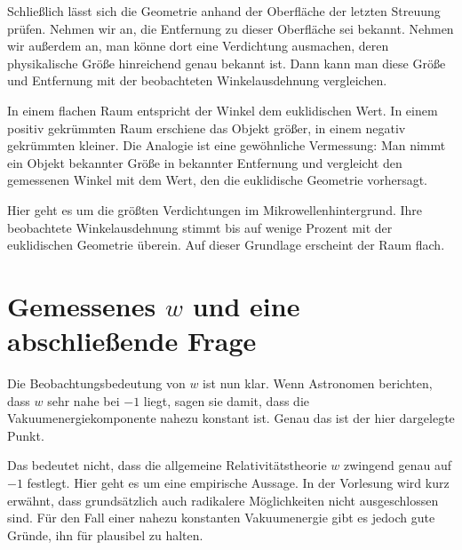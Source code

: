 Schließlich lässt sich die Geometrie anhand der Oberfläche der letzten Streuung prüfen. Nehmen wir an, die Entfernung zu dieser Oberfläche sei bekannt. Nehmen wir außerdem an, man könne dort eine Verdichtung ausmachen, deren physikalische Größe hinreichend genau bekannt ist. Dann kann man diese Größe und Entfernung mit der beobachteten Winkelausdehnung vergleichen.

In einem flachen Raum entspricht der Winkel dem euklidischen Wert. In einem positiv gekrümmten Raum erschiene das Objekt größer, in einem negativ gekrümmten kleiner. Die Analogie ist eine gewöhnliche Vermessung: Man nimmt ein Objekt bekannter Größe in bekannter Entfernung und vergleicht den gemessenen Winkel mit dem Wert, den die euklidische Geometrie vorhersagt.

\begin{classroomqa}\end{classroomqa}

Hier geht es um die größten Verdichtungen im Mikrowellenhintergrund. Ihre beobachtete Winkelausdehnung stimmt bis auf wenige Prozent mit der euklidischen Geometrie überein. Auf dieser Grundlage erscheint der Raum flach.

\section{Gemessenes \(w\) und eine abschließende Frage}

Die Beobachtungsbedeutung von \(w\) ist nun klar. Wenn Astronomen berichten, dass \(w\) sehr nahe bei \(-1\) liegt, sagen sie damit, dass die Vakuumenergiekomponente nahezu konstant ist. Genau das ist der hier dargelegte Punkt.

Das bedeutet nicht, dass die allgemeine Relativitätstheorie \(w\) zwingend genau auf \(-1\) festlegt. Hier geht es um eine empirische Aussage. In der Vorlesung wird kurz erwähnt, dass grundsätzlich auch radikalere Möglichkeiten nicht ausgeschlossen sind. Für den Fall einer nahezu konstanten Vakuumenergie gibt es jedoch gute Gründe, ihn für plausibel zu halten.

